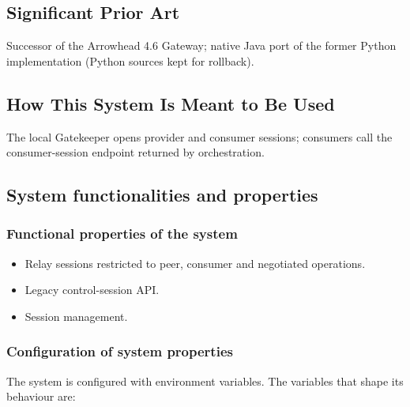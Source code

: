 \documentclass[a4paper]{arrowhead}
\begin{document}
\newpage

\subsection{Significant Prior Art}
\label{sec:prior_art}

Successor of the Arrowhead 4.6 Gateway; native Java port of the former Python implementation (Python sources kept for rollback).

\subsection{How This System Is Meant to Be Used}
\label{sec:use}

The local Gatekeeper opens provider and consumer sessions; consumers call the consumer-session endpoint returned by orchestration.

\subsection{System functionalities and properties}
\label{sec:properties}

\subsubsection{Functional properties of the system}

\begin{itemize}
  \item Relay sessions restricted to peer, consumer and negotiated operations.
  \item Legacy control-session API.
  \item Session management.
\end{itemize}

\subsubsection{Configuration of system properties}

The system is configured with environment variables. The variables that shape its behaviour are:
\end{document}
